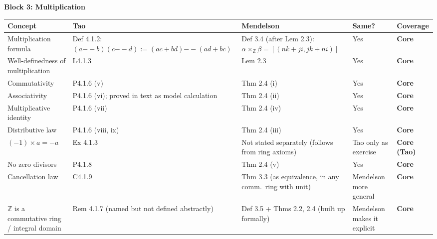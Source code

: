 \noindent\textbf{Block 3: Multiplication}

\begin{exposition}
\smallskip
\end{exposition}
\begin{tabular}{p{} p{} p{} p{} p{}}
\toprule
\textbf{Concept} & \textbf{Tao} & \textbf{Mendelson} & \textbf{Same?} & \textbf{Coverage} \\
\midrule

Multiplication formula
& Def 4.1.2: $(a{-\!\!-}b)(c{-\!\!-}d):=(ac+bd){-\!\!-}(ad+bc)$
& Def 3.4 (after Lem 2.3): $\alpha\times_\mathbb{Z}\beta=[(nk+ji,jk+ni)]$
& Yes
& \textbf{Core}
\\[6pt]

Well-definedness of multiplication
& L4.1.3
& Lem 2.3
& Yes
& \textbf{Core}
\\[6pt]

Commutativity
& P4.1.6 (v)
& Thm 2.4 (i)
& Yes
& \textbf{Core}
\\[6pt]

Associativity
& P4.1.6 (vi); proved in text as model calculation
& Thm 2.4 (ii)
& Yes
& \textbf{Core}
\\[6pt]

Multiplicative identity
& P4.1.6 (vii)
& Thm 2.4 (iv)
& Yes
& \textbf{Core}
\\[6pt]

Distributive law
& P4.1.6 (viii, ix)
& Thm 2.4 (iii)
& Yes
& \textbf{Core}
\\[6pt]

$(-1)\times a = -a$
& Ex 4.1.3
& Not stated separately (follows from ring axioms)
& Tao only as exercise
& \textbf{Core (Tao)}
\\[6pt]

No zero divisors
& P4.1.8
& Thm 2.4 (v)
& Yes
& \textbf{Core}
\\[6pt]

Cancellation law
& C4.1.9
& Thm 3.3 (as equivalence, in any comm.\ ring with unit)
& Mendelson more general
& \textbf{Core}
\\[6pt]

$\mathbb{Z}$ is a commutative ring / integral domain
& Rem 4.1.7 (named but not defined abstractly)
& Def 3.5 + Thms 2.2, 2.4 (built up formally)
& Mendelson makes it explicit
& \textbf{Core}
\\

\bottomrule
\end{tabular}

